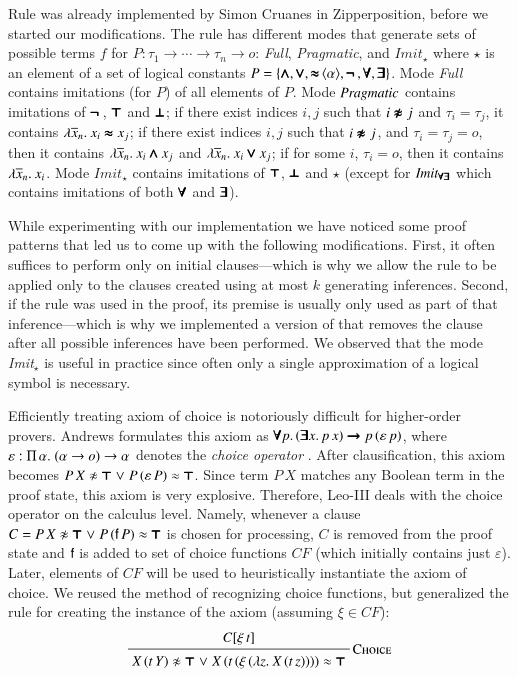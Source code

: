 Rule  was already implemented by Simon Cruanes in Zipperposition,
before we started our modifications. The rule has different modes that generate
sets of possible terms $f$ for $P: \tau_1 \rightarrow \cdots \rightarrow \tau_n
\rightarrow o$: \emph{Full}, \emph{Pragmatic}, and $\mathit{Imit}_{\star}$ where
$\star$ is an element of a set of logical constants $P = \{ \pmb{\land}, \pmb{\lor},
\mathop{\pmb{\approx}}{\langle\alpha\rangle}, \pmb{\neg\,}, \pmb{\forall}, \pmb{\exists} \}$. Mode \emph{Full}
contains imitations (for $P$) of all elements of $P$. Mode $\emph{Pragmatic}$
contains imitations of $\pmb{\neg\,}$, $\pmb{\top}$ and $\pmb{\bot}$; if there exist indices $i,j$
such that $i\pmb{\not\approx} j$ and  $\tau_i = \tau_j$, it contains $\lambda \overline{x}_{n}.\> x_i
\pmb{\approx} x_j$; if there exist indices $i,j$ such that $i \pmb{\not\approx} j$, and $\tau_i =
\tau_j = o$, then it contains $\lambda \overline{x}_{n}.\> x_i \pmb{\land} x_j$ and
$\lambda \overline{x}_{n}.\> x_i \pmb{\lor} x_j$; if for some $i$, $\tau_i = o$, then it
contains $\lambda \overline{x}_{n}.\> x_i$. Mode $\mathit{Imit}_\star$ contains
imitations of $\pmb{\top}$, $\pmb{\bot}$ and $\star$ (except for $\mathit{Imit_{\pmb{\forall}\pmb{\exists}}}$ which contains imitations
of both $\pmb{\forall}$ and $\pmb{\exists}$).

While experimenting with our implementation we have noticed some proof patterns
that led us to come up with the following modifications. First, it often
suffices to perform  only on initial clauses---which is why we
allow the rule to be applied only to the clauses created using at most $k$
generating inferences. Second, if the rule was used in the proof, its premise
is usually only used as part of that inference---which is why we implemented
a version of  that removes the clause after all possible 
inferences have been performed. We observed that the mode \emph{Imit}$_\star$ is useful in practice since often only a single
approximation of a logical symbol is necessary.

Efficiently treating axiom of choice is notoriously difficult for higher-order provers. Andrews formulates
this axiom as $\pmb{\forall} p.\, (\pmb{\exists}
x.\, p \, x) \pmb{\rightarrow} p \, (\varepsilon \, p)$, where $\varepsilon :
\Pi\,\alpha.\;(\alpha \rightarrow o) \rightarrow \alpha$ denotes the \emph{choice
operator} \cite{pa-01-classical-ty-thy}. After clausification, this axiom becomes $P \, X \noteq \itrue \llor P
\, (\varepsilon \, P) \eq \itrue$. Since term $P \, X$ matches any Boolean
term in the proof state, this axiom is very explosive. Therefore, Leo-III
\cite{sb-21-leo3} deals with the choice operator on the calculus
level. Namely, whenever a clause $C = P \, X \noteq \itrue \llor P \, (\cst{f} \,
P) \eq \itrue$ is chosen for processing, $C$ is removed from the proof state and $\mathsf{f}$ is
added to set of choice functions $\mathit{CF}$ (which initially contains just
$\varepsilon$). Later, elements of $\mathit{CF}$ will be used to heuristically
instantiate the axiom of choice. We reused the method of recognizing choice
functions, but generalized the rule for creating the instance of
the axiom (assuming $\xi \in \mathit{CF}$):
%
$$\namedinference{Choice}
               {C[\xi \, t]}
               { X \, (t \, Y) \noteq \itrue \llor X \, (t \, (\xi \, (\lam{z}{X \, (t \, z)})) ) \eq \itrue }$$
%

